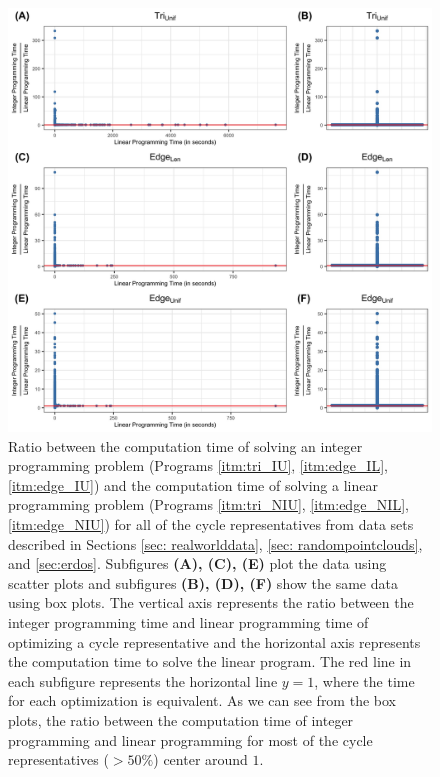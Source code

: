 \begin{figure}[h!]
\begin{center}
\includegraphics[width=\textwidth]{figures/IPvsLP.jpg} 
\end{center}
 \caption{ 
 Ratio between the computation time of solving an integer programming problem (Programs \ref{itm:tri_IU}, \ref{itm:edge_IL}, \ref{itm:edge_IU}) and the computation time of solving a linear programming problem (Programs \ref{itm:tri_NIU}, \ref{itm:edge_NIL}, \ref{itm:edge_NIU}) for all of the cycle representatives from data sets described in Sections \ref{sec: realworlddata}, \ref{sec: randompointclouds}, and \ref{sec:erdos}. Subfigures  \textbf{(A), (C), (E)} plot the data using scatter plots and subfigures  \textbf{(B), (D), (F)} show the same data using box plots. The vertical axis represents the ratio between the integer programming time and linear programming time of optimizing a cycle representative and the horizontal axis represents the computation time to solve the linear program. The red line in each subfigure represents the horizontal line $y=1$, where the time for each optimization is equivalent. As we can see from the box plots, the ratio between the computation time of integer programming and linear programming for most of the cycle representatives ($>50\%$) center around $1$.}\label{fig:lp_mip_ratio_df}
\end{figure}



